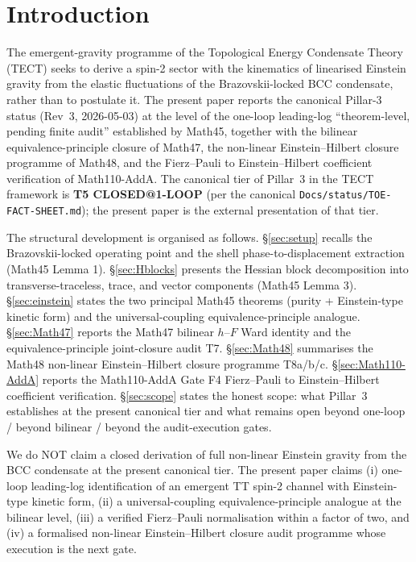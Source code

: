 \section{Introduction}\label{sec:intro}

The emergent-gravity programme of the Topological Energy Condensate
Theory (TECT) seeks to derive a spin-2 sector with the kinematics of
linearised Einstein gravity from the elastic fluctuations of the
Brazovskii-locked BCC condensate, rather than to postulate it. The
present paper reports the canonical Pillar-3 status (Rev~3,
2026-05-03) at the level of the one-loop leading-log
``theorem-level, pending finite audit'' established by Math45,
together with the bilinear equivalence-principle closure of Math47,
the non-linear Einstein--Hilbert closure programme of Math48, and the
Fierz--Pauli to Einstein--Hilbert coefficient verification of
Math110-AddA. The canonical tier of Pillar~3 in the TECT framework is
\textbf{T5 CLOSED@1-LOOP} (per the canonical
\texttt{Docs/status/TOE-FACT-SHEET.md}); the present paper is the
external presentation of that tier.

The structural development is organised as follows. \S\ref{sec:setup}
recalls the Brazovskii-locked operating point and the shell
phase-to-displacement extraction (Math45 Lemma 1). \S\ref{sec:Hblocks}
presents the Hessian block decomposition into transverse-traceless,
trace, and vector components (Math45 Lemma 3). \S\ref{sec:einstein}
states the two principal Math45 theorems (purity + Einstein-type
kinetic form) and the universal-coupling equivalence-principle
analogue. \S\ref{sec:Math47} reports the Math47 bilinear $h$--$F$
Ward identity and the equivalence-principle joint-closure audit T7.
\S\ref{sec:Math48} summarises the Math48 non-linear Einstein--Hilbert
closure programme T8a/b/c. \S\ref{sec:Math110-AddA} reports the
Math110-AddA Gate F4 Fierz--Pauli to Einstein--Hilbert coefficient
verification. \S\ref{sec:scope} states the honest scope: what
Pillar~3 establishes at the present canonical tier and what remains
open beyond one-loop / beyond bilinear / beyond the audit-execution
gates.

We do NOT claim a closed derivation of full non-linear Einstein
gravity from the BCC condensate at the present canonical tier. The
present paper claims (i) one-loop leading-log identification of an
emergent TT spin-2 channel with Einstein-type kinetic form, (ii) a
universal-coupling equivalence-principle analogue at the bilinear
level, (iii) a verified Fierz--Pauli normalisation within a factor
of two, and (iv) a formalised non-linear Einstein--Hilbert closure
audit programme whose execution is the next gate.

